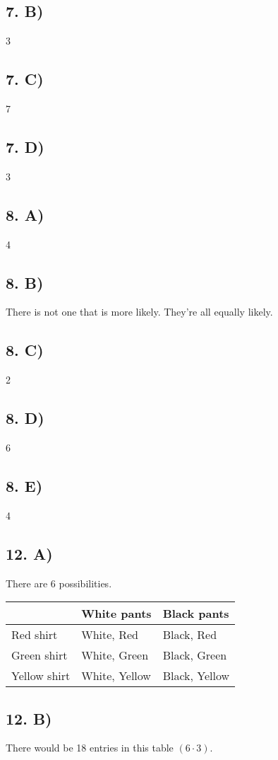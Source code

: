 \documentclass[12]{scrartcl}
\begin{document}
\subsection*{7. B)}
3
\subsection*{7. C)}
7
\subsection*{7. D)}
3
\subsection*{8. A)}
4
\subsection*{8. B)}
There is not one that is more likely. They're all equally likely. 
\subsection*{8. C)}
2
\subsection*{8. D)}
6
\subsection*{8. E)}
4
\subsection*{12. A)}
There are 6 possibilities. 
\begin{table}
    \begin{tabular}{|l|l|l|}
    \hline
    ~            & White pants   & Black pants   \\ \hline
    Red shirt    & White, Red    & Black, Red    \\ \hline
    Green shirt  & White, Green  & Black, Green  \\ \hline
    Yellow shirt & White, Yellow & Black, Yellow \\ \hline
    \end{tabular}
\end{table}
\subsection*{12. B)}
There would be 18 entries in this table $(6 \cdot 3)$.
\end{document}
